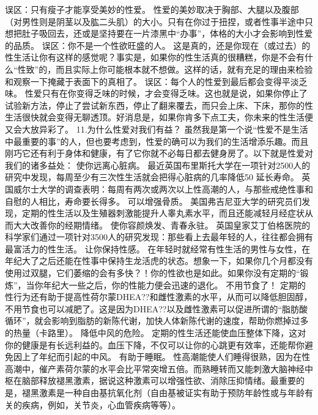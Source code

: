 \documentclass[12pt,UTF8]{ctexbook}
\begin{document}
误区：只有瘦子才能享受美妙的性爱。
性爱的美妙取决于胸部、大腿以及腹部（对男性则是阴茎以及肱二头肌）的大小。只有在你过于扭捏，或者性事半途中只想把肚子吸回去，还或是坚持要在一片漆黑中“办事”，体格的大小才会影响到性爱的品质。
误区：你不是一个性欲旺盛的人。
这是真的，还是你现在（或过去）的性生活让你有这样的感觉呢？事实是，如果你的性生活真的很糟糕，你是不会有什么“性致”的，而且实际上你可能根本就不想做。这样的话，就有充足的理由来检验和观察一下掩藏于表面下的真相了。
误区：每个人的性爱到最后都会变得平淡乏味。
性爱只有在你变得乏味的时候，才会变得乏味。这也就是说，如果你停止了试验新方法，停止了尝试新东西，停止了翻来覆去，而只会上床、下床，那你的性生活很快就会变得无聊透顶。好消息是，如果你肯多下点工夫，你未来的性生活便又会大放异彩了。
11.为什么性爱对我们有益？
虽然我是第一个说“性爱不是生活中最重要的事”的人，但也要考虑到，性爱的确可以为我们的生活增添乐趣。而且刚巧它还有利于身体和健康，有了它你就不必每日都去健身房了。以下就是性爱对我们的诸多益处：
使你远离心脏病。
最近英国布里斯托大学在一项针对2500人的研究中发现，每周至少有三次性生活就会把得心脏病的几率降低50%
延长寿命。
英国威尔士大学的调查表明：每周有两次或两次以上性高潮的人，与那些戒绝性事和自慰的人相比，寿命要长得多。
可以增强骨质。
美国弗吉尼亚大学的研究员们发现，定期的性生活以及生殖器刺激能提升人睾丸素水平，而且还能减轻月经症状从而大大改善你的经期情绪。
使你容颜焕发、青春永驻。
英国皇家艾丁伯格医院的科学家们通过一项针对3500人的研究发现：那些看上去最年轻的人，往往都会拥有最富活力的性生活。
让你保持性感。
在年轻时就经常有性生活的男性与女性，在年纪大了之后还能在性事中保持生龙活虎的状态。想象一下，如果你几个月都没有使用过双腿，它们萎缩的会有多快？！你的性欲也是如此。如果你没有定期的“锻炼”，当你年纪大一些之后，你的性能力便会迅速的退化。
不用节食了！
定期的性行为还有助于提高性荷尔蒙DHEA??和雌性激素的水平，从而可以降低胆固醇，不用节食也可以减肥了。这是因为DHEA??以及雌性激素可以促进所谓的“脂肪酸循环”，就会影响到脂肪的新陈代谢，加快人体新陈代谢的速度，帮助你燃掉过多的热量（卡路里）。
降低中风的危险。
定期的性生活还能使血压整体下降，这对你的健康是有长远利益的。血压下降，不仅可以让你的心跳更有效率，还能帮你避免因上了年纪而引起的中风。
有助于睡眠。
性高潮能使人们睡得很熟，因为在性高潮中，催产素荷尔蒙的水平会比平常突增五倍。而熟睡转而又能刺激大脑神经中枢在脑部释放褪黑激素，据说这种激素可以增强性欲、消除压抑情绪。最重要的是，褪黑激素是一种自由基抗氧化剂（自由基被证实有助于预防年龄性或与年龄有关的疾病，例如，关节炎，心血管疾病等等）。
\end{document}
